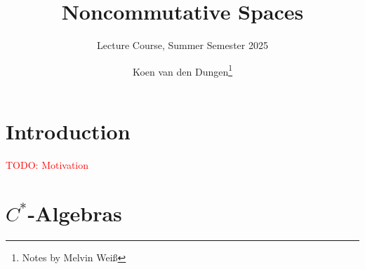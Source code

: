 \documentclass[american]{scrartcl}
\title{Noncommutative Spaces}
\subtitle{Lecture Course, Summer Semester 2025}
\author{Koen van den Dungen\thanks{Notes by Melvin Weiß}}
\newcommand{\todo}[1]{\textcolor{red}{TODO: #1}}
\begin{document}
	\maketitle
	
	\cleardoublepage
	
	\tableofcontents
	
	\cleardoublepage
	
	
	
	\section{Introduction}
	\todo{Motivation}
	
	\section{$C^*$-Algebras}
\end{document}
